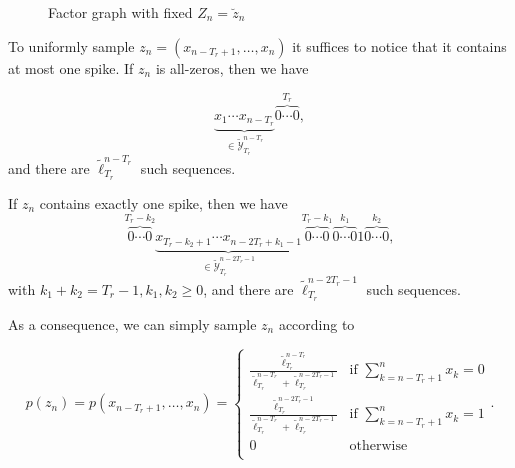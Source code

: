 \documentclass{article}
\begin{document}
    \begin{figure}[!ht]
      \centering
      \caption{Factor graph with fixed $Z_n = \breve{z}_n$} \label{fig:factor_graph_fix}
    \end{figure}

    To uniformly sample $z_n = (x_{n-T_r + 1}, \dots, x_n)$ it suffices to notice that it contains at most one spike.
    If $z_n$ is all-zeros, then we have 

    \begin{equation*}
      \underbrace{x_1 \cdots x_{n-T_r}}_{\in \tilde{\mathcal{Y}}_{T_r}^{n-T_r}} \overbrace{0 \cdots 0}^{T_r},
    \end{equation*}
    and there are $\tilde{\ell}_{T_r}^{n-T_r}$ such sequences. 

    If $z_n$ contains exactly one spike, then we have 
    \begin{equation*}
      \overbrace{0 \cdots 0}^{T_r - k_2} \underbrace{x_{T_r - k_2 + 1} \cdots x_{n-2T_r + k_1 - 1}}_{\in \tilde{\mathcal{Y}}_{T_r}^{n-2T_r-1}} 
      \overbrace{0 \cdots 0}^{T_r - k_1}
      \overbrace{0 \cdots 0}^{k_1} 
      1 
      \overbrace{0 \cdots 0}^{k_2},
    \end{equation*}
    with $k_1 + k_2 = T_r - 1, k_1, k_2 \geq 0$, and there are $\tilde{\ell}_{T_r}^{n-2T_r-1}$ such sequences. 

    As a consequence, we can simply sample $z_n$ according to 

    \begin{equation}  
      p(z_{n}) = p(x_{n-T_r + 1}, \dots, x_n) = 
      \left\{
        \begin{array}{ll}
          \frac{\tilde{\ell}_{T_r}^{n-T_r}}{\tilde{\ell}_{T_r}^{n-T_r} + \tilde{\ell}_{T_r}^{n-2T_r-1}} & \mbox{if } \sum_{k=n-T_r+1}^n x_{k} = 0 \\
          \frac{\tilde{\ell}_{T_r}^{n-2T_r-1}}{\tilde{\ell}_{T_r}^{n-T_r} + \tilde{\ell}_{T_r}^{n-2T_r-1}} & \mbox{if } \sum_{k=n-T_r+1}^n x_{k} = 1 \\
          0 & \mbox{otherwise} \\
        \end{array}
      \right..
    \end{equation}
\end{document}
